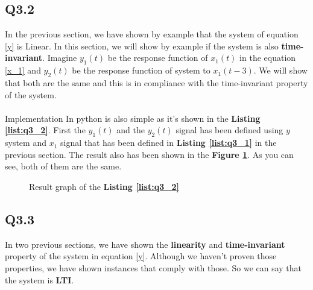 \subsection{Q3.2}

In the previous section, we have shown by example 
that the system of equation \ref{y} is Linear. In this
 section, we will show by example if the system is also
  \textbf{time-invariant}. Imagine $y_1(t)$ be the 
  response function of $x_1(t)$ in the equation 
  \ref{x_1} and $y_2(t)$ be the response function 
  of system to $x_1(t-3)$. We will show that both are 
  the same and this is in compliance with the 
  time-invariant property of the system.

\paragraph{}Implementation In python is also simple as 
it's shown in the \textbf{Listing \ref{list:q3_2}}. First the 
$y_1(t)$ and the $y_2(t)$ signal has been defined 
using $y$ system and $x_1$ signal that has been 
defined in \textbf{ Listing \ref{list:q3_1}} in the previous 
section. The result also has been shown in the 
\textbf{Figure \ref{fig:Q3_2}}. As you can see, both of them 
are the same.


\begin{figure}[H]
  \centering
  \scalebox{0.4}{}
  \caption{Result graph of the \textbf{Listing \ref{list:q3_2}}}
  \label{fig:Q3_2}
\end{figure}
\subsection{Q3.3}
In two previous sections, we have shown 
the \textbf{linearity} and \textbf{time-invariant}
 property of the system in equation \ref{y}. Although 
 we haven't proven those properties, we have shown 
 instances that comply with those. So we can say that 
 the system is \textbf{LTI}.
